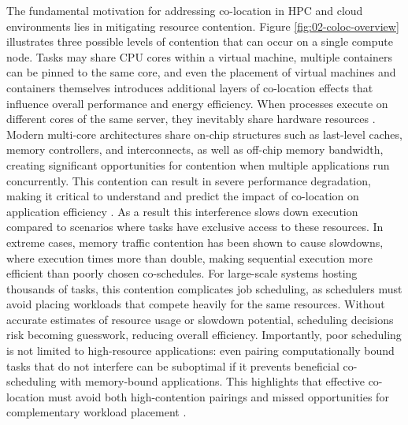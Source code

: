 The fundamental motivation for addressing co-location in HPC and cloud environments lies in mitigating resource contention. Figure \ref{fig:02-coloc-overview} illustrates three possible levels of contention that can occur on a single compute node. Tasks may share CPU cores within a virtual machine, multiple containers can be pinned to the same core, and even the placement of virtual machines and containers themselves introduces additional layers of co-location effects that influence overall performance and energy efficiency. When processes execute on different cores of the same server, they inevitably share hardware resources \cite{Blagodurov_2010} \cite{7349920}. Modern multi-core architectures share on-chip structures such as last-level caches, memory controllers, and interconnects, as well as off-chip memory bandwidth, creating significant opportunities for contention when multiple applications run concurrently. This contention can result in severe performance degradation, making it critical to understand and predict the impact of co-location on application efficiency \cite{Blagodurov_2012}. As a result this interference slows down execution compared to scenarios where tasks have exclusive access to these resources. In extreme cases, memory traffic contention has been shown to cause slowdowns, where execution times more than double, making sequential execution more efficient than poorly chosen co-schedules. For large-scale systems hosting thousands of tasks, this contention complicates job scheduling, as schedulers must avoid placing workloads that compete heavily for the same resources. Without accurate estimates of resource usage or slowdown potential, scheduling decisions risk becoming guesswork, reducing overall efficiency. Importantly, poor scheduling is not limited to high-resource applications: even pairing computationally bound tasks that do not interfere can be suboptimal if it prevents beneficial co-scheduling with memory-bound applications. This highlights that effective co-location must avoid both high-contention pairings and missed opportunities for complementary workload placement \cite{inproceedings} \cite{10.1007/978-3-031-48803-0_31}.

